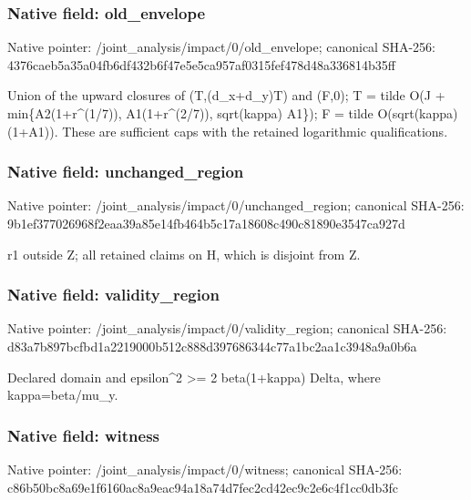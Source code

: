 \documentclass[10pt,a4paper]{article}
\begin{document}
\subsubsection{Native field: old\_\allowbreak{}envelope}
Native pointer: /joint\_\allowbreak{}analysis/impact/0/old\_\allowbreak{}envelope; canonical SHA-256: 4376caeb5a35a04fb6df432b6f47e5e5ca957af0315fef478d48a336814b35ff

\begingroup\raggedright\sloppy Union of the upward closures of (T,\allowbreak{}(d\_\allowbreak{}x+d\_\allowbreak{}y)T) and (F,\allowbreak{}0);\allowbreak{} T =\allowbreak{} tilde O(J + min\{A2(1+r\textasciicircum{}(1/\allowbreak{}7)),\allowbreak{} A1(1+r\textasciicircum{}(2/\allowbreak{}7)),\allowbreak{} sqrt(kappa) A1\});\allowbreak{} F =\allowbreak{} tilde O(sqrt(kappa)(1+A1)). These are sufficient caps with the retained logarithmic qualifications.\par\endgroup

\subsubsection{Native field: unchanged\_\allowbreak{}region}
Native pointer: /joint\_\allowbreak{}analysis/impact/0/unchanged\_\allowbreak{}region; canonical SHA-256: 9b1ef377026968f2eaa39a85e14fb464b5c17a18608c490c81890e3547ca927d

\begingroup\raggedright\sloppy r1 outside Z;\allowbreak{} all retained claims on H,\allowbreak{} which is disjoint from Z.\par\endgroup

\subsubsection{Native field: validity\_\allowbreak{}region}
Native pointer: /joint\_\allowbreak{}analysis/impact/0/validity\_\allowbreak{}region; canonical SHA-256: d83a7b897bcfbd1a2219000b512c888d397686344c77a1bc2aa1c3948a9a0b6a

\begingroup\raggedright\sloppy Declared domain and epsilon\textasciicircum{}2 >=\allowbreak{} 2 beta(1+kappa) Delta,\allowbreak{} where kappa=\allowbreak{}beta/\allowbreak{}mu\_\allowbreak{}y.\par\endgroup

\subsubsection{Native field: witness}
Native pointer: /joint\_\allowbreak{}analysis/impact/0/witness; canonical SHA-256: c86b50bc8a69e1f6160ac8a9eac94a18a74d7fec2cd42ec9c2e6c4f1cc0db3fc
\end{document}
